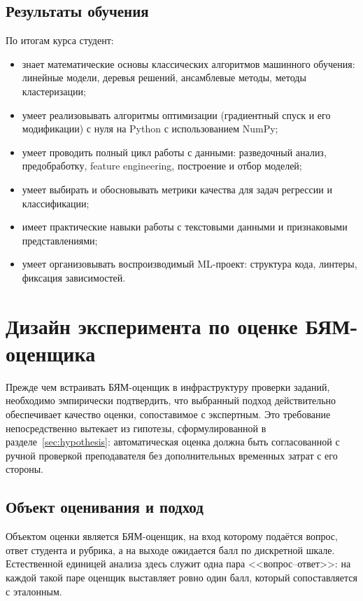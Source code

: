 \subsection{Результаты обучения}

По итогам курса студент:

\begin{itemize}
    \item знает математические основы классических алгоритмов машинного обучения: линейные модели, деревья решений, ансамблевые методы, методы кластеризации;
    \item умеет реализовывать алгоритмы оптимизации (градиентный спуск и его модификации) с нуля на Python с использованием NumPy;
    \item умеет проводить полный цикл работы с данными: разведочный анализ, предобработку, feature engineering, построение и отбор моделей;
    \item умеет выбирать и обосновывать метрики качества для задач регрессии и классификации;
    \item имеет практические навыки работы с текстовыми данными и признаковыми представлениями;
    \item умеет организовывать воспроизводимый ML-проект: структура кода, линтеры, фиксация зависимостей.
\end{itemize}

\section{Дизайн эксперимента по оценке БЯМ-оценщика}\label{sec:eval_design}

Прежде чем встраивать БЯМ-оценщик в инфраструктуру проверки заданий, необходимо
эмпирически подтвердить, что выбранный подход действительно обеспечивает
качество оценки, сопоставимое с экспертным. Это требование непосредственно
вытекает из гипотезы, сформулированной в разделе~\ref{sec:hypothesis}:
автоматическая оценка должна быть согласованной с ручной проверкой
преподавателя без дополнительных временных затрат с его стороны.

\subsection{Объект оценивания и подход}

Объектом оценки является БЯМ-оценщик, на вход которому подаётся вопрос,
ответ студента и рубрика, а на выходе ожидается балл по дискретной шкале.
Естественной единицей анализа здесь служит одна пара <<вопрос--ответ>>: на
каждой такой паре оценщик выставляет ровно один балл, который сопоставляется
с эталонным.

